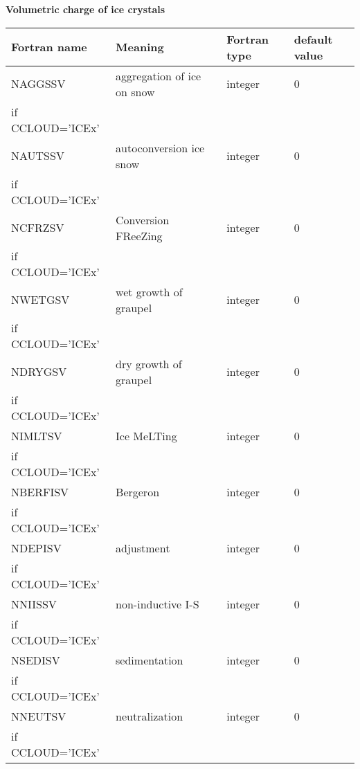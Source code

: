 \textbf{Volumetric charge of ice crystals}
\begin{longtable} {|p{}|p{}|>{\centering}p{}|p{}<{\centering}|}
\hline
Fortran name & Meaning & Fortran type & default value \\
\hline \hline
\endhead
NAGGSSV & aggregation of ice on snow & integer & 0 \\ \nopagebreak
if CCLOUD='ICEx' &&& \\\hline

NAUTSSV & autoconversion ice snow& integer & 0 \\ \nopagebreak
if CCLOUD='ICEx' &&& \\\hline

NCFRZSV & Conversion FReeZing & integer & 0 \\ \nopagebreak
if CCLOUD='ICEx' &&& \\\hline

NWETGSV & wet growth of graupel & integer & 0 \\ \nopagebreak
if CCLOUD='ICEx' &&& \\\hline

NDRYGSV & dry growth of graupel & integer & 0 \\ \nopagebreak
if CCLOUD='ICEx' &&& \\\hline

NIMLTSV & Ice MeLTing & integer & 0 \\ \nopagebreak
if CCLOUD='ICEx' &&& \\\hline

NBERFISV & Bergeron & integer & 0 \\ \nopagebreak
if CCLOUD='ICEx' &&& \\\hline

NDEPISV & adjustment& integer & 0 \\ \nopagebreak
if CCLOUD='ICEx' &&& \\\hline

NNIISSV & non-inductive I-S & integer & 0 \\ \nopagebreak
if CCLOUD='ICEx' &&& \\\hline

NSEDISV & sedimentation& integer & 0 \\ \nopagebreak
if CCLOUD='ICEx' &&& \\\hline

NNEUTSV & neutralization & integer & 0 \\ \nopagebreak
if CCLOUD='ICEx' &&& \\\hline
\end{longtable}

